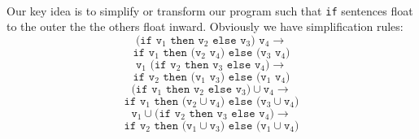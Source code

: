 \documentclass[a4paper]{article}
\begin{document}
\paragraph{}
Our key idea is to simplify or transform our program such that \texttt{if} sentences float to the outer the the others float inward. Obviously we have simplification rules:
$$
	\texttt{(if v$_1$ then v$_2$ else v$_3$) v$_4$}\longrightarrow
$$
\begin{equation}
	\texttt{if v$_1$ then (v$_2$ v$_4$) else (v$_3$ v$_4$)}
	\tag{\sc I-Cnd-App-Simp1}
\end{equation}
$$
	\texttt{v$_1$ (if v$_2$ then v$_3$ else v$_4$)}\longrightarrow
$$
\begin{equation}
	\texttt{if v$_2$ then (v$_1$ v$_3$) else (v$_1$ v$_4$)}
	\tag{\sc I-Cnd-App-Simp2}
\end{equation}
$$
	\texttt{(if v$_1$ then v$_2$ else v$_3$)$\cup$v$_4$}\longrightarrow
$$
\begin{equation}
	\texttt{if v$_1$ then (v$_2$$\cup$v$_4$) else (v$_3$$\cup$v$_4$)}
	\tag{\sc I-Cnd-Union-Simp1}
\end{equation}
$$
	\texttt{v$_1$$\cup$(if v$_2$ then v$_3$ else v$_4$)}\longrightarrow
$$
\begin{equation}
	\texttt{if v$_2$ then (v$_1$$\cup$v$_3$) else (v$_1$$\cup$v$_4$)}
	\tag{\sc I-Cnd-Union-Simp2}
\end{equation}
\end{document}
